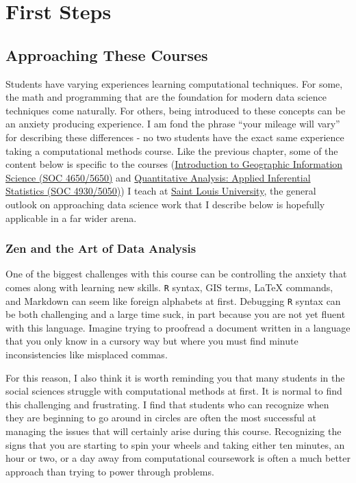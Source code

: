 \documentclass[]{book}
\theoremstyle{definition}
\theoremstyle{definition}
\theoremstyle{definition}
\theoremstyle{remark}
\begin{document}
\part{First Steps}\label{part-first-steps}

\chapter{Approaching These Courses}\label{approaching-these-courses}

Students have varying experiences learning computational techniques. For
some, the math and programming that are the foundation for modern data
science techniques come naturally. For others, being introduced to these
concepts can be an anxiety producing experience. I am fond the phrase
``your mileage will vary'' for describing these differences - no two
students have the exact same experience taking a computational methods
course. Like the previous chapter, some of the content below is specific
to the courses (\href{https://slu-soc5650.github.io}{Introduction to
Geographic Information Science (SOC 4650/5650)} and
\href{https://slu-soc5050.github.io}{Quantitative Analysis: Applied
Inferential Statistics (SOC 4930/5050)}) I teach at
\href{https://www.slu.edu}{Saint Louis University}, the general outlook
on approaching data science work that I describe below is hopefully
applicable in a far wider arena.

\hypertarget{zen-and-the-art-of-data-analysis}{\section{Zen and the Art
of Data Analysis}\label{zen-and-the-art-of-data-analysis}}

One of the biggest challenges with this course can be controlling the
anxiety that comes along with learning new skills. \texttt{R} syntax,
GIS terms, LaTeX commands, and Markdown can seem like foreign alphabets
at first. Debugging \texttt{R} syntax can be both challenging and a
large time suck, in part because you are not yet fluent with this
language. Imagine trying to proofread a document written in a language
that you only know in a cursory way but where you must find minute
inconsistencies like misplaced commas.

For this reason, I also think it is worth reminding you that many
students in the social sciences struggle with computational methods at
first. It is normal to find this challenging and frustrating. I find
that students who can recognize when they are beginning to go around in
circles are often the most successful at managing the issues that will
certainly arise during this course. Recognizing the signs that you are
starting to spin your wheels and taking either ten minutes, an hour or
two, or a day away from computational coursework is often a much better
approach than trying to power through problems.
\end{document}
